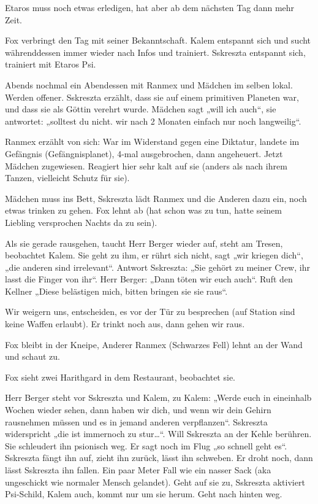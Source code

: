 \documentclass[11pt]{scrartcl}
\begin{document}
Etaros muss noch etwas erledigen, hat aber ab dem nächsten Tag dann mehr
Zeit.

Fox verbringt den Tag mit seiner Bekanntschaft. Kalem entspannt sich und
sucht währenddessen immer wieder nach Infos und trainiert. Sskreszta
entspannt sich, trainiert mit Etaros Psi.

Abends nochmal ein Abendessen mit Ranmex und Mädchen im selben lokal.
Werden offener. Sskreszta erzählt, dass sie auf einem primitiven
Planeten war, und dass sie als Göttin verehrt wurde. Mädchen sagt „will
ich auch``, sie antwortet: „solltest du nicht. wir nach 2 Monaten
einfach nur noch langweilig``.

Ranmex erzählt von sich: War im Widerstand gegen eine Diktatur, landete
im Gefängnis (Gefängnisplanet), 4-mal ausgebrochen, dann angeheuert.
Jetzt Mädchen zugewiesen. Reagiert hier sehr kalt auf sie (anders als
nach ihrem Tanzen, vielleicht Schutz für sie).

Mädchen muss ins Bett, Sskreszta lädt Ranmex und die Anderen dazu ein,
noch etwas trinken zu gehen. Fox lehnt ab (hat schon was zu tun, hatte
seinem Liebling versprochen Nachts da zu sein).

Als sie gerade rausgehen, taucht Herr Berger wieder auf, steht am
Tresen, beobachtet Kalem. Sie geht zu ihm, er rührt sich nicht, sagt
„wir kriegen dich``, „die anderen sind irrelevant``. Antwort Sskreszta:
„Sie gehört zu meiner Crew, ihr lasst die Finger von ihr``. Herr Berger:
„Dann töten wir euch auch``. Ruft den Kellner „Diese belästigen mich,
bitten bringen sie sie raus``.

Wir weigern uns, entscheiden, es vor der Tür zu besprechen (auf Station
sind keine Waffen erlaubt). Er trinkt noch aus, dann gehen wir raus.

Fox bleibt in der Kneipe, Anderer Ranmex (Schwarzes Fell) lehnt an der
Wand und schaut zu.

Fox sieht zwei Harithgard in dem Restaurant, beobachtet sie.

Herr Berger steht vor Sskreszta und Kalem, zu Kalem: „Werde euch in
eineinhalb Wochen wieder sehen, dann haben wir dich, und wenn wir dein
Gehirn rausnehmen müssen und es in jemand anderen verpflanzen``.
Sskreszta widerspricht „die ist immernoch zu stur\ldots{}``. Will
Sskreszta an der Kehle berühren. Sie schleudert ihn psionisch weg. Er
sagt noch im Flug „so schnell geht es``. Sskreszta fängt ihn auf, zieht
ihn zurück, lässt ihn schweben. Er droht noch, dann lässt Sskreszta ihn
fallen. Ein paar Meter Fall wie ein nasser Sack (aka ungeschickt wie
normaler Mensch gelandet). Geht auf sie zu, Sskreszta aktiviert
Psi-Schild, Kalem auch, kommt nur um sie herum. Geht nach hinten weg.
\end{document}
